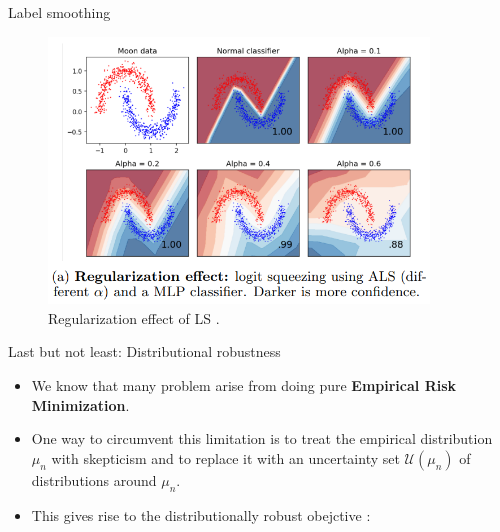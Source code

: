 \documentclass{beamer}
\begin{document}
\begin{frame}{Label smoothing}
    \begin{figure}
    \includegraphics[width=0.90\textwidth]{images/adversarial_label_smoothing.PNG}
    \caption{Regularization effect of LS \cite{goibert2019adversarial}.}
    \end{figure}

\end{frame}

\begin{frame}{Last but not least: Distributional robustness}
    \begin{itemize}
        \item We know that many problem arise from doing pure \textbf{Empirical Risk Minimization}.
        \item One way to circumvent this limitation is to treat the empirical distribution $\mu_n$ with skepticism and to replace it with an uncertainty set $\mathcal{U}(\mu_n)$ of distributions around $\mu_n$.
        \item This gives rise to the distributionally robust obejctive \cite{blanchet2019data, blanchet2019robust}:
    \end{itemize}
\end{frame}
\end{document}
